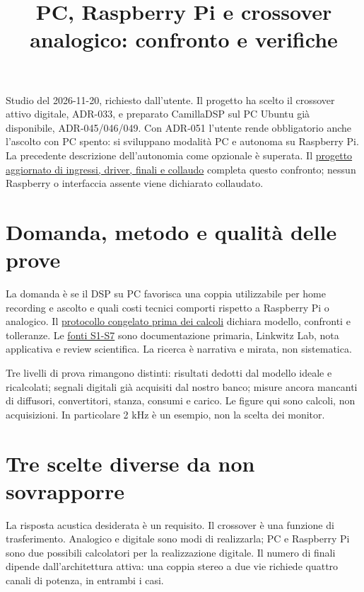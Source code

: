 \documentclass[
  italian,
  11pt,
  a4paper,
]{article}
\title{PC, Raspberry Pi e crossover analogico: confronto e verifiche}
\author{}
\date{}
\begin{document}
\maketitle

Studio del 2026-11-20, richiesto dall'utente. Il progetto ha scelto il crossover attivo
digitale, ADR-033, e preparato CamillaDSP sul PC Ubuntu già disponibile, ADR-045/046/049.
Con ADR-051 l'utente rende obbligatorio anche l'ascolto con PC spento: si sviluppano
modalità PC e autonoma su Raspberry Pi. La precedente descrizione dell'autonomia come
opzionale è superata. Il \href{sistema-autonomo-driver-e-collaudo.pdf}{progetto aggiornato
di ingressi, driver, finali e collaudo} completa questo confronto; nessun Raspberry o
interfaccia assente viene dichiarato collaudato.

\section{Domanda, metodo e qualità delle
prove}\label{domanda-metodo-e-qualituxe0-delle-prove}

La domanda è se il DSP su PC favorisca una coppia utilizzabile per home recording e ascolto
e quali costi tecnici comporti rispetto a Raspberry Pi o analogico. Il
\href{../../research-vault/crossover-pc-pi-analogico/scope.md}{protocollo congelato prima
dei calcoli} dichiara modello, confronti e tolleranze. Le
\href{../../research-vault/crossover-pc-pi-analogico/sources.md}{fonti S1-S7} sono
documentazione primaria, Linkwitz Lab, nota applicativa e review scientifica. La ricerca è
narrativa e mirata, non sistematica.

Tre livelli di prova rimangono distinti: risultati dedotti dal modello ideale e ricalcolati;
segnali digitali già acquisiti dal nostro banco; misure ancora mancanti di diffusori,
convertitori, stanza, consumi e carico. Le figure qui sono calcoli, non acquisizioni. In
particolare 2 kHz è un esempio, non la scelta dei monitor.

\section{Tre scelte diverse da non sovrapporre}\label{tre-scelte-diverse-da-non-sovrapporre}

La risposta acustica desiderata è un requisito. Il crossover è una funzione di
trasferimento. Analogico e digitale sono modi di realizzarla; PC e Raspberry Pi sono due
possibili calcolatori per la realizzazione digitale. Il numero di finali dipende
dall'architettura attiva: una coppia stereo a due vie richiede quattro canali di potenza, in
entrambi i casi.
\end{document}
